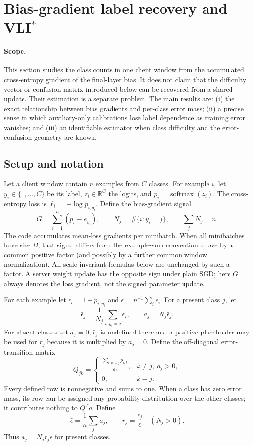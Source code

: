 \documentclass[11pt]{article}
\newcommand{\R}{\mathbb{R}}
\begin{document}
\section{Bias-gradient label recovery and VLI$^*$}
\label{sec:vli-star}

\paragraph{Scope.} This section studies the class counts in one client window
from the accumulated cross-entropy gradient of the final-layer bias. It does
not claim that the difficulty vector or confusion matrix introduced below can
be recovered from a shared update. Their estimation is a separate problem.
The main results are: (i) the exact relationship between bias gradients and
per-class error mass; (ii) a precise sense in which auxiliary-only
calibrations lose label dependence as training error vanishes; and (iii) an
identifiable estimator when class difficulty and the error-confusion geometry
are known.

\subsection{Setup and notation}
Let a client window contain $n$ examples from $C$ classes. For example $i$,
let $y_i\in\{1,\ldots,C\}$ be its label, $z_i\in\R^C$ the logits, and
$p_i=\operatorname{softmax}(z_i)$. The cross-entropy loss is
$\ell_i=-\log p_{i,y_i}$. Define the bias-gradient signal
\[
  G=\sum_{i=1}^n(p_i-e_{y_i}), \qquad
  N_j=\#\{i:y_i=j\}, \qquad \sum_jN_j=n.
\]
The code accumulates mean-loss gradients per minibatch. When all minibatches
have size $B$, that signal differs from the example-sum convention above by a
common positive factor (and possibly by a further common window normalization).
All scale-invariant formulas below are unchanged by such a factor. A server
weight update has the opposite sign under plain SGD; here $G$ always denotes
the loss gradient, not the signed parameter update.

For each example let $\epsilon_i=1-p_{i,y_i}$ and
$\bar\epsilon=n^{-1}\sum_i\epsilon_i$. For a present class $j$, let
\[
 \bar\epsilon_j=\frac{1}{N_j}\sum_{i:y_i=j}\epsilon_i,
 \qquad a_j=N_j\bar\epsilon_j.
\]
For absent classes set $a_j=0$; $\bar\epsilon_j$ is undefined there and a
positive placeholder may be used for $r_j$ because it is multiplied by
$a_j=0$. Define the off-diagonal error-transition matrix
\[
 Q_{jk}=\begin{cases}
 \displaystyle\frac{\sum_{i:y_i=j}p_{i,k}}{a_j},& k\ne j,\ a_j>0,\\
 0,& k=j.
 \end{cases}
\]
Every defined row is nonnegative and sums to one. When a class has zero error
mass, its row can be assigned any probability distribution over the other
classes; it contributes nothing to $Q^Ta$. Define
\[
 \bar\epsilon=\frac1n\sum_j a_j,\qquad
 r_j=\frac{\bar\epsilon_j}{\bar\epsilon}\quad(N_j>0).
\]
Thus $a_j=N_jr_j\bar\epsilon$ for present classes.
\end{document}
